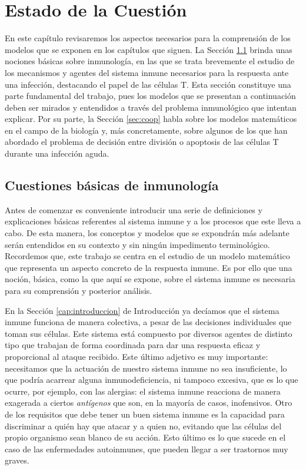 \chapter{Estado de la Cuestión}
\label{cap:estadoDeLaCuestion}


En este capítulo revisaremos los aspectos necesarios para la comprensión de los modelos que se exponen en los capítulos que siguen. La Sección \ref{sec:cuestInmuno} brinda unas nociones básicas sobre inmunología, en las que se trata brevemente el estudio de los mecanismos y agentes del sistema inmune necesarios para la respuesta ante una infección, destacando el papel de las células T. Esta sección constituye una parte fundamental del trabajo, pues los modelos que se presentan a continuación deben ser mirados y entendidos a través del problema inmunológico que intentan explicar. Por su parte, la Sección \ref{sec:coop} habla sobre los modelos matemáticos en el campo de la biología y, más concretamente, sobre algunos de los que han abordado el problema de decisión entre división o apoptosis de las células T durante una infección aguda. 


\section{Cuestiones básicas de inmunología}
\label{sec:cuestInmuno}

Antes de comenzar es conveniente introducir una serie de definiciones y explicaciones básicas referentes al sistema inmune y a los procesos que este lleva a cabo. De esta manera, los conceptos y modelos que se expondrán más adelante serán entendidos en su contexto y sin ningún impedimento terminológico. Recordemos que, este trabajo se centra en el estudio de un modelo matemático que representa un aspecto concreto de la respuesta inmune. Es por ello que una noción, básica, como la que aquí se expone, sobre el sistema inmune es necesaria para su comprensión y posterior análisis.

En la Sección \ref{cap:introduccion} de Introducción ya decíamos que el sistema inmune funciona de manera colectiva, a pesar de las decisiones individuales que toman sus células. Este sistema está compuesto por diversos agentes de distinto tipo que trabajan de forma coordinada para dar una respuesta eficaz y proporcional al ataque recibido. Este último adjetivo es muy importante: necesitamos que la actuación de nuestro sistema inmune no sea insuficiente, lo que podría acarrear alguna inmunodeficiencia, ni tampoco excesiva, que es lo que ocurre, por ejemplo, con las alergias: el sistema inmune reacciona de manera exagerada a ciertos \textit{antígenos} que son, en la mayoría de casos, inofensivos. Otro de los requisitos que debe tener un buen sistema inmune es la capacidad para discriminar a quién hay que atacar y a quien no, evitando que las células del propio organismo sean blanco de su acción. Esto último es lo que sucede en el caso de las enfermedades autoinmunes, que pueden llegar a ser trastornos muy graves.

